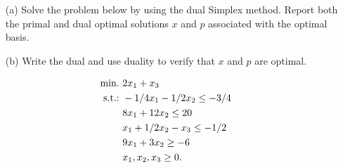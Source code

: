 \begin{itemize}
\item[(a)] Solve the problem below by using the dual Simplex method. Report both the primal and dual optimal solutions $x$ and $p$ associated with the optimal basis.
\item[(b)] Write the dual and use duality to verify that $x$ and $p$ are optimal.
\end{itemize}
%
\begin{align*}
	\mathop{\text{min.~}} & 2x_1 + x_3  \\
	\mathop{\text{s.t.:~}} & -1/4 x_1 - 1/2 x_2 \leq -3/4 \\
	& 8x_1 + 12 x_2 \leq 20 \\
	& x_1 + 1/2 x_2 - x_3 \leq -1/2 \\
	& 9x_1 + 3 x_2 \geq -6 \\
	& x_1, x_2, x_3 \geq 0.
\end{align*}
